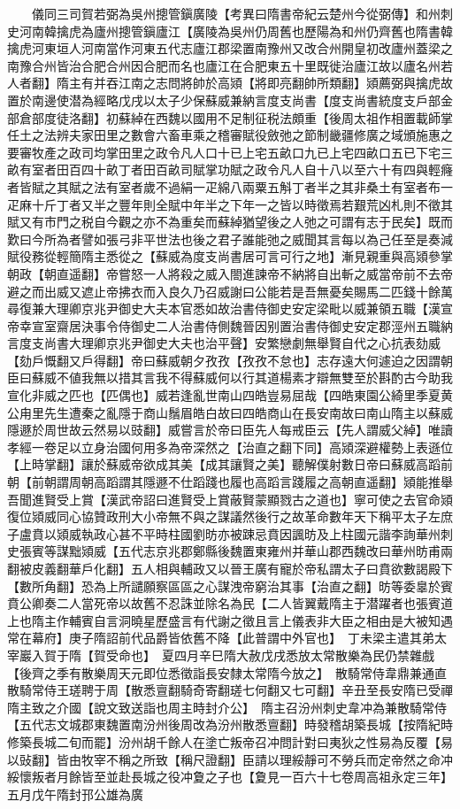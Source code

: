 　　儀同三司賀若弼為吳州摠管鎭廣陵【考異曰隋書帝紀云楚州今從弼傳】和州刺史河南韓擒虎為廬州摠管鎭廬江【廣陵為吳州仍周舊也歷陽為和州仍齊舊也隋書韓擒虎河東垣人河南當作河東五代志廬江郡梁置南豫州又改合州開皇初改廬州蓋梁之南豫合州皆治合肥合州因合肥而名也廬江在合肥東五十里既徙治廬江故以廬名州若人者翻】隋主有并吞江南之志問將帥於高熲【將即亮翻帥所類翻】熲薦弼與擒虎故置於南邊使潜為經略戊戌以太子少保蘇威兼納言度支尚書【度支尚書統度支戶部金部倉部度徒洛翻】初蘇綽在西魏以國用不足制征税法頗重【後周太祖作相置載師掌任土之法辨夫家田里之數會六畜車乘之稽審賦役斂弛之節制畿疆修廣之域頒施惠之要審牧產之政司均掌田里之政令凡人口十已上宅五畝口九已上宅四畝口五已下宅三畝有室者田百四十畝丁者田百畝司賦掌功賦之政令凡人自十八以至六十有四與輕癃者皆賦之其賦之法有室者歲不過絹一疋綿八兩粟五斛丁者半之其非桑土有室者布一疋麻十斤丁者又半之豐年則全賦中年半之下年一之皆以時徵焉若艱荒凶札則不徵其賦又有市門之税自今觀之亦不為重矣而蘇綽猶望後之人弛之可謂有志于民矣】既而歎曰今所為者譬如張弓非平世法也後之君子誰能弛之威聞其言每以為己任至是奏減賦役務從輕簡隋主悉從之【蘇威為度支尚書居可言可行之地】漸見親重與高熲參掌朝政【朝直遥翻】帝嘗怒一人將殺之威入閤進諫帝不納將自出斬之威當帝前不去帝避之而出威又遮止帝拂衣而入良久乃召威謝曰公能若是吾無憂矣賜馬二匹錢十餘萬尋復兼大理卿京兆尹御史大夫本官悉如故治書侍御史安定梁毗以威兼領五職【漢宣帝幸宣室齋居決事令侍御史二人治書侍側魏晉因别置治書侍御史安定郡涇州五職納言度支尚書大理卿京兆尹御史大夫也治平聲】安繁戀劇無舉賢自代之心抗表劾威【劾戶慨翻又戶得翻】帝曰蘇威朝夕孜孜【孜孜不怠也】志存遠大何遽迫之因謂朝臣曰蘇威不値我無以措其言我不得蘇威何以行其道楊素才辯無雙至於斟酌古今助我宣化非威之匹也【匹偶也】威若逢亂世南山四皓豈易屈哉【四皓東園公綺里季夏黄公甪里先生遭秦之亂隱于商山鬚眉皓白故曰四皓商山在長安南故曰南山隋主以蘇威隱遯於周世故云然易以豉翻】威嘗言於帝曰臣先人每戒臣云【先人謂威父綽】唯讀孝經一卷足以立身治國何用多為帝深然之【治直之翻下同】高熲深避權勢上表遜位【上時掌翻】讓於蘇威帝欲成其美【成其讓賢之美】聽解僕射數日帝曰蘇威高蹈前朝【前朝謂周朝高蹈謂其隱遯不仕蹈踐也履也高蹈言踐履之高朝直遥翻】熲能推舉吾聞進賢受上賞【漢武帝詔曰進賢受上賞蔽賢蒙顯戮古之道也】寧可使之去官命熲復位熲威同心協贊政刑大小帝無不與之謀議然後行之故革命數年天下稱平太子左庶子盧賁以熲威執政心甚不平時柱國劉昉亦被踈忌賁因諷昉及上柱國元諧李詢華州刺史張賓等謀黜熲威【五代志京兆郡鄭縣後魏置東雍州并華山郡西魏改曰華州昉甫兩翻被皮義翻華戶化翻】五人相與輔政又以晉王廣有寵於帝私謂太子曰賁欲數謁殿下【數所角翻】恐為上所譴願察區區之心謀洩帝窮治其事【治直之翻】昉等委辠於賓賁公卿奏二人當死帝以故舊不忍誅並除名為民【二人皆翼戴隋主于潜躍者也張賓道上也隋主作輔賓自言洞曉星歷盛言有代謝之徵且言上儀表非大臣之相由是大被知遇常在幕府】庚子隋詔前代品爵皆依舊不降【此普謂中外官也】　丁未梁主遣其弟太宰巖入賀于隋【賀受命也】　夏四月辛巳隋大赦戊戌悉放太常散樂為民仍禁雜戲【後齊之季有散樂周天元即位悉徵詣長安隸太常隋今放之】　散騎常侍韋鼎兼通直散騎常侍王瑳聘于周【散悉亶翻騎奇寄翻瑳七何翻又七可翻】辛丑至長安隋已受禪隋主致之介國【說文致送詣也周主時封介公】　隋主召汾州刺史韋冲為兼散騎常侍【五代志文城郡東魏置南汾州後周改為汾州散悉亶翻】時發稽胡築長城【按隋紀時修築長城二旬而罷】汾州胡千餘人在塗亡叛帝召冲問計對曰夷狄之性易為反覆【易以䜴翻】皆由牧宰不稱之所致【稱尺證翻】臣請以理綏靜可不勞兵而定帝然之命冲綏懷叛者月餘皆至並赴長城之役冲夐之子也【夐見一百六十七卷周高祖永定三年】　五月戊午隋封邘公雄為廣